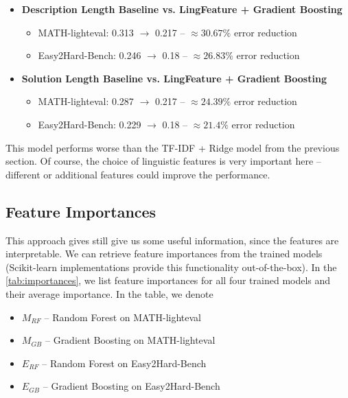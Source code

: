 \documentclass[runningheads]{llncs}
\begin{document}
\begin{itemize}
    \item \textbf{Description Length Baseline vs. LingFeature + Gradient Boosting}
    \begin{itemize}
        \item MATH-lighteval: 0.313 $\to$ 0.217 -- $\approx 30.67\%$ error reduction
        \item Easy2Hard-Bench: 0.246 $\to$ 0.18 -- $\approx 26.83\%$ error reduction
    \end{itemize}

\vspace{20pt}

    \item \textbf{Solution Length Baseline vs. LingFeature + Gradient Boosting}
    \begin{itemize}
        \item MATH-lighteval: 0.287 $\to$ 0.217 -- $\approx 24.39\%$ error reduction
        \item Easy2Hard-Bench: 0.229 $\to$ 0.18 -- $\approx 21.4\%$ error reduction
    \end{itemize}
\end{itemize}

This model performs worse than the TF-IDF + Ridge model from the previous section. Of course, the choice of linguistic features is very important here -- different or additional features could improve the performance.

\subsection{Feature Importances}

This approach gives still give us some useful information, since the features are interpretable. We can retrieve feature importances from the trained models (Scikit-learn implementations provide this functionality out-of-the-box). In the \cref{tab:importances}, we list feature importances for all four trained models and their average importance. In the table, we denote

\begin{itemize}
    \item $M_{RF}$ -- Random Forest on MATH-lighteval
    \item $M_{GB}$ -- Gradient Boosting on MATH-lighteval
    \item $E_{RF}$ -- Random Forest on Easy2Hard-Bench
    \item $E_{GB}$ -- Gradient Boosting on Easy2Hard-Bench
\end{itemize}
\end{document}

